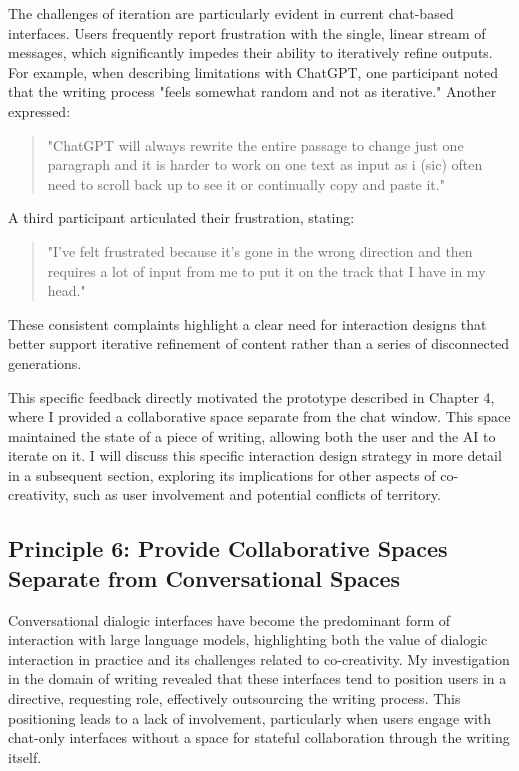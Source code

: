 The challenges of iteration are particularly evident in current chat-based interfaces. Users frequently report frustration with the single, linear stream of messages, which significantly impedes their ability to iteratively refine outputs. For example, when describing limitations with ChatGPT, one participant noted that the writing process "feels somewhat random and not as iterative." Another expressed:

\begin{quote}
"ChatGPT will always rewrite the entire passage to change just one paragraph and it is harder to work on one text as input as i (sic) often need to scroll back up to see it or continually copy and paste it."
\end{quote}

A third participant articulated their frustration, stating:

\begin{quote}
"I've felt frustrated because it's gone in the wrong direction and then requires a lot of input from me to put it on the track that I have in my head."
\end{quote}

These consistent complaints highlight a clear need for interaction designs that better support iterative refinement of content rather than a series of disconnected generations. 


This specific feedback directly motivated the prototype described in Chapter 4, where I provided a collaborative space separate from the chat window. This space maintained the state of a piece of writing, allowing both the user and the AI to iterate on it. I will discuss this specific interaction design strategy in more detail in a subsequent section, exploring its implications for other aspects of co-creativity, such as user involvement and potential conflicts of territory.


\subsection{Principle 6: Provide Collaborative Spaces Separate from Conversational Spaces}

Conversational dialogic interfaces have become the predominant form of interaction with large language models, highlighting both the value of dialogic interaction in practice and its challenges related to co-creativity. My investigation in the domain of writing revealed that these interfaces tend to position users in a directive, requesting role, effectively outsourcing the writing process. This positioning leads to a lack of involvement, particularly when users engage with chat-only interfaces without a space for stateful collaboration through the writing itself.

